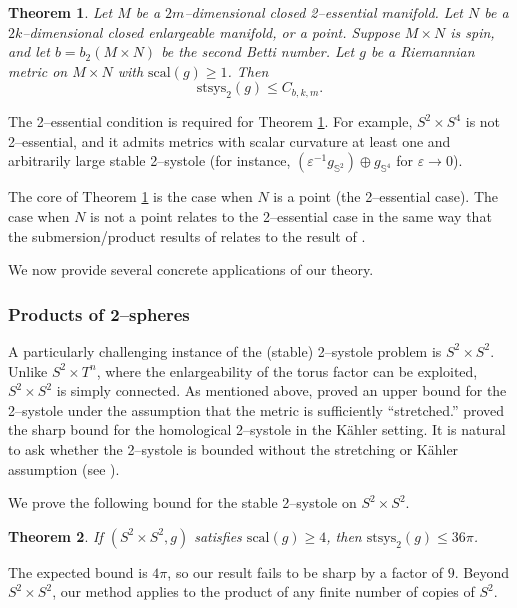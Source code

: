 \documentclass[12pt]{amsart}
\newtheorem{theorem}{Theorem}[section]
\theoremstyle{definition}
\numberwithin{equation}{section}
\newcommand{\eps}{\varepsilon}
\begin{document}
\begin{theorem}\label{thm:gen}
Let $M$ be a $2m$--dimensional closed 2--essential manifold. Let $N$ be a $2k$--dimensional closed enlargeable manifold, or a point. Suppose $M \times N$ is spin, and let $b = b_2(M \times N)$ be the second Betti number. Let $g$ be a Riemannian metric on $M \times N$ with $\mathrm{scal}(g) \geq 1$. Then
\[ \mathrm{stsys}_2(g) \leq C_{b, k, m}. \]
\end{theorem}

The 2--essential condition is required for Theorem \ref{thm:gen}. For example, $S^2 \times S^4$ is not 2--essential, and it admits metrics with scalar curvature at least one and arbitrarily large stable 2--systole (for instance, $(\eps^{-1}g_{\mathbb{S}^2}) \oplus g_{\mathbb{S}^4}$ for $\eps \to 0$).

The core of Theorem \ref{thm:gen} is the case when $N$ is a point (the 2--essential case). The case when $N$ is not a point relates to the 2--essential case in the same way that the submersion/product results of \cite{Llarull:sub, Goette-Semmelmann, Tony, Riedler-Tony} relates to the result of \cite{Llarull}.

We now provide several concrete applications of our theory.

\subsubsection{Products of 2--spheres}
A particularly challenging instance of the (stable) 2--systole problem is $S^2 \times S^2$. Unlike $S^2 \times T^n$, where the enlargeability of the torus factor can be exploited, $S^2 \times S^2$ is simply connected. As mentioned above, \cite{Richard:s2xs2} proved an upper bound for the 2--systole under the assumption that the metric is sufficiently ``stretched.'' \cite{Sha:main} proved the sharp bound for the homological 2--systole in the K{\"a}hler setting. It is natural to ask whether the 2--systole is bounded without the stretching or K{\"a}hler assumption (see \cite[Question 6.2]{Richard-Zhu:survey}).

We prove the following bound for the stable 2--systole on $S^2 \times S^2$.

\begin{theorem}\label{thm:s2xs2}
If $(S^2 \times S^2, g)$ satisfies $\mathrm{scal}(g) \geq 4$, then $\mathrm{stsys}_2(g) \leq 36\pi$.
\end{theorem}

The expected bound is $4\pi$, so our result fails to be sharp by a factor of $9$. Beyond $S^2 \times S^2$, our method applies to the product of any finite number of copies of $S^2$.
\end{document}
